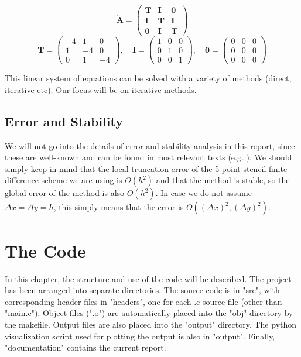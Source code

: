 \documentclass[11pt]{report}
\begin{document}
\begin{equation}
\overleftrightarrow{\textbf{A}} = 
\begin{pmatrix}
\bm{T} & \bm{I} & \bm{0} \\
\bm{I} & \bm{T} & \bm{I} \\
\bm{0} & \bm{I} & \bm{T}
\end{pmatrix}
\end{equation}
\vspace{0.5cm}
\begin{equation}
\bm{T} =
\begin{pmatrix}
-4 & 1 & 0 \\
1 & -4 & 0 \\
0 & 1 & -4
\end{pmatrix}
, \quad
\bm{I} =
\begin{pmatrix}
1 & 0 & 0 \\
0 & 1 & 0 \\
0 & 0 & 1
\end{pmatrix}
, \quad
\bm{0} =
\begin{pmatrix}
0 & 0 & 0 \\
0 & 0 & 0 \\
0 & 0 & 0
\end{pmatrix}
\end{equation}

\vspace{0.5cm}

This linear system of equations can be solved with a variety of methods (direct, iterative etc). Our focus will be on iterative methods.

\section{Error and Stability}
We will not go into the details of error and stability analysis in this report, since these are well-known 
and can be found in most relevant texts (e.g. \cite{leveque}). We should simply keep in mind that the local truncation error of the 5-point stencil finite difference scheme we are using is $O(h^2)$ and that the method is stable, so the global error of the method is also $O(h^2)$. In case we do not assume $\Delta x = \Delta y = h$, this 
simply means that the error is $O\left( (\Delta x)^2, (\Delta y)^2 \right)$.

\chapter{The Code}
In this chapter, the structure and use of the code will be described. The project has been arranged into 
separate directories. The source code is in "src", with corresponding header files in "headers", one for each 
.c source file (other than "main.c"). Object files (".o") are automatically placed into the "obj" directory by the makefile. Output files are also placed into the "output" directory. The python visualization script used 
for plotting the output is also in "output". Finally, "documentation" contains the current report.
\end{document}
